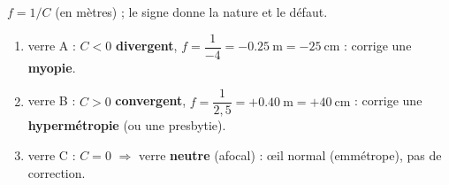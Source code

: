 \documentclass[11pt,a4paper]{article}
\begin{document}
\begin{corrige}
$f=1/C$ (en mètres) ; le signe donne la nature et le défaut.
\begin{enumerate}[label=\alph*)]
  \item verre A : $C<0$ \textbf{divergent}, $f=\dfrac{1}{-4}=-\qty{0.25}{\m}=-\qty{25}{\cm}$ :
        corrige une \textbf{myopie}.
  \item verre B : $C>0$ \textbf{convergent}, $f=\dfrac{1}{2,5}=+\qty{0.40}{\m}=+\qty{40}{\cm}$ :
        corrige une \textbf{hypermétropie} (ou une presbytie).
  \item verre C : $C=0$ $\Rightarrow$ verre \textbf{neutre} (afocal) : \oe il normal (emmétrope), pas
        de correction.
\end{enumerate}
\end{corrige}
\end{document}
